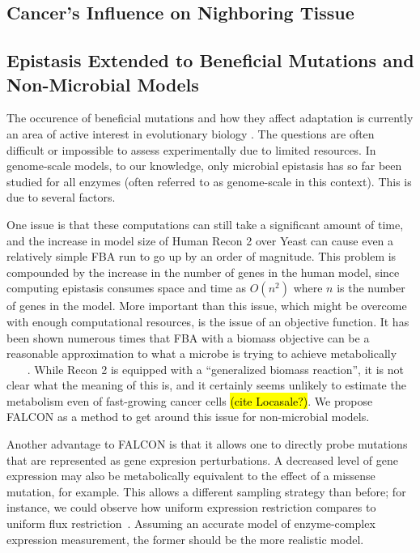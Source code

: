 \documentclass[phd,tocprelim]{cornell}
\begin{document}
\subsection{Cancer's Influence on Nighboring Tissue}
\subsection{Epistasis Extended to Beneficial Mutations and Non-Microbial Models}

The occurence of beneficial mutations and how they affect adaptation
is currently an area of active interest in evolutionary biology
\cite{Chou2011} \cite{Weinreich2006}. The questions are often
difficult or impossible to assess experimentally due to limited
resources.  In genome-scale models, to our knowledge, only microbial
epistasis has so far been studied for all enzymes (often referred to
as genome-scale in this context). This is due to several factors.

One issue is that these computations can still take a significant
amount of time, and the increase in model size of Human Recon 2 over
Yeast can cause even a relatively simple FBA run to go up by an order
of magnitude.  This problem is compounded by the increase in the
number of genes in the human model, since computing epistasis consumes
space and time as $O(n^2)$ where $n$ is the number of genes in the
model. More important than this issue, which might be overcome with
enough computational resources, is the issue of an objective
function. It has been shown numerous times that FBA with a biomass
objective can be a reasonable approximation to what a microbe is
trying to achieve metabolically
~\cite{Schuetz2012}~\cite{Fong2004}~\cite{Varma1994} . While Recon 2
is equipped with a ``generalized biomass reaction'', it is not clear
what the meaning of this is, and it certainly seems unlikely to
estimate the metabolism even of fast-growing cancer cells \hl{(cite
  Locasale?)}. We propose FALCON as a method to get around this issue
for non-microbial models.

Another advantage to FALCON is that it allows one to directly probe
mutations that are represented as gene expresion perturbations. A
decreased level of gene expression may also be metabolically
equivalent to the effect of a missense mutation, for example. This
allows a different sampling strategy than before; for instance, we
could observe how uniform expression restriction compares to uniform
flux restriction~\cite{Xu2012}. Assuming an accurate model of
enzyme-complex expression measurement, the former should be the more
realistic model.
\end{document}
